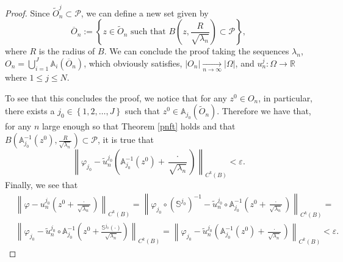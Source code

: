 \documentclass{amsart}
\theoremstyle{definition}
\theoremstyle{remark}
\newcommand{\ep}{\varepsilon}
\newcommand{\vp}{\varphi}
\renewcommand\leq\leqslant
\numberwithin{equation}{section}
\theoremstyle{definition}
\theoremstyle{remark}
\begin{document}
\begin{proof}
	Since $\tilde{O}_n^j\subset\mathcal{P}$, we can define a new set given by \begin{equation}
	     \overline{O}_n:=\left\{z\in\tilde{O}_n \text{ such that }B\left(z,\frac{R}{\sqrt{\lambda_n}}\right)\subset\mathcal{P}\right\},
	\end{equation}where $R$ is the radius of $B$. We can conclude the proof taking the sequences $\lambda_n$, $O_n=\bigcup_{i=1}^J\mathbb{A}_i \left(\overline{O}_n\right)$, which obviously satisfies, $\left|O_n\right|\xrightarrow[n\rightarrow\infty]{}\left|\Omega\right|$, and $u_{n}^j:\Omega\rightarrow\mathbb{R}$ where  $1\leq j\leq N$.
	
	To see that this concludes the proof, we notice that for any $z^0\in O_{n}$, in particular, there exists a $j_0\in\left\{1,2,\ldots,J\right\}$ such that $z^0\in  \mathbb{A}_{j_0}\left(\tilde{O}_{n}\right)$. Therefore we have that, for any $n$ large enough so that Theorem \ref{pnft} holds and that  $B\left(\mathbb{A}_{j_0}^{-1}\left(z^0\right),\frac{R}{\sqrt{\lambda_n}}\right)\subset\mathcal{P}$, it is true that \begin{equation}
		\left\|\vp_{j_0}-\tilde{u}^{j_0}_{n}\left(\mathbb{A}_{j_0}^{-1}\left(z^0\right)+\frac{\cdot}{\sqrt{\lambda_n}}\right)\right\|_{C^k(B)}<\ep.
	\end{equation}
	Finally, we see that 
	\begin{equation}
		\begin{aligned}
		&	\left\|\vp-u^{j_0}_{n}\left(z^0+\frac{\cdot}{\sqrt{\lambda_n}}\right)\right\|_{C^k(B)}=\left\|\vp_{j_0}\circ\left(\mathbb{S}^{j_0}\right)^{-1}-\tilde{u}^{j_0}_{n}\circ\mathbb{A}_{j_0}^{-1}\left(z^0+\frac{\cdot}{\sqrt{\lambda_n}}\right)\right\|_{C^k(B)}=\\&\left\|\vp_{j_0}-\tilde{u}^{j_0}_{n}\circ\mathbb{A}_{j_0}^{-1}\left(z^0+\frac{\mathbb{S}^{j_0}\left(\cdot\right)}{\sqrt{\lambda_n}}\right)\right\|_{C^k(B)}=\left\|\vp_{j_0}-\tilde{u}^{j_0}_{n}\left(\mathbb{A}_{j_0}^{-1}\left(z^0\right)+\frac{\cdot}{\sqrt{\lambda_n}}\right)\right\|_{C^k(B)}<\ep.
		\end{aligned}
	\end{equation}
\end{proof}
\end{document}
